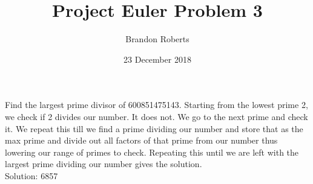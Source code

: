 \documentclass{article}
\begin{document}
\title{Project Euler Problem 3}
\author{Brandon Roberts}
\date{23 December 2018}

\maketitle

Find the largest prime divisor of 600851475143. Starting from the lowest prime 2, we check if 2 divides our number. It does not. We go to the next prime and check it. We repeat this till we find a prime dividing our number and store that as the max prime and divide out all factors of that prime from our number thus lowering our range of primes to check. Repeating this until we are left with the largest prime dividing our number gives the solution.\\
Solution: 6857
\end{document}
